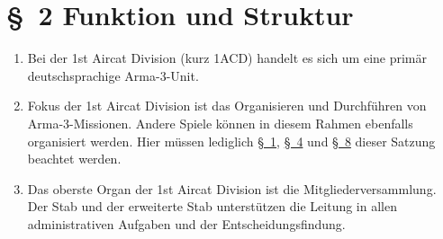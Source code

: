 \section*{\S~2 Funktion und Struktur} 
\label{sec:funktion_und_struktur}

\begin{enumerate}[label=(\arabic*)]
    \item Bei der 1st Aircat Division (kurz 1ACD) handelt es sich um eine primär deutschsprachige Arma-3-Unit.
    \item Fokus der 1st Aircat Division ist das Organisieren und Durchführen von Arma-3-Missionen. Andere Spiele können in diesem Rahmen ebenfalls organisiert werden. Hier müssen lediglich \hyperref[sec:allgemeine_verhaltensregeln]{\S~1}, \hyperref[sec:mitgliedschaft]{\S~4} und \hyperref[sec:umgang_mit_regelverstoeßen]{\S~8} dieser Satzung beachtet werden.
    \item Das oberste Organ der 1st Aircat Division ist die Mitgliederversammlung. Der Stab und der erweiterte Stab unterstützen die Leitung in allen administrativen Aufgaben und der Entscheidungsfindung.
\end{enumerate}
